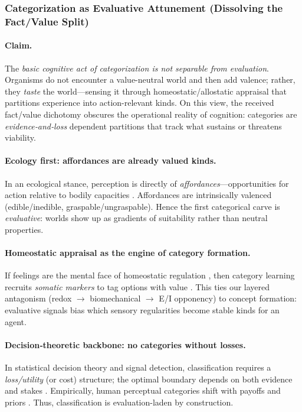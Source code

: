 \subsubsection{Categorization as Evaluative Attunement (Dissolving the Fact/Value Split)}
\label{subsec:categorization_evaluative}

\paragraph{Claim.}
The \emph{basic cognitive act of categorization is not separable from evaluation}. Organisms do not encounter a value-neutral world and then add valence; rather, they \emph{taste} the world—sensing it through homeostatic/allostatic appraisal that partitions experience into action-relevant kinds. On this view, the received fact/value dichotomy obscures the operational reality of cognition: categories are \emph{evidence‐and‐loss} dependent partitions that track what sustains or threatens viability.

\paragraph{Ecology first: affordances are already valued kinds.}
In an ecological stance, perception is directly of \emph{affordances}—opportunities for action relative to bodily capacities \citep{Gibson1979_Ecological}. Affordances are intrinsically valenced (edible/inedible, graspable/ungraspable). Hence the first categorical carve is \emph{evaluative}: worlds show up as gradients of suitability rather than neutral properties.

\paragraph{Homeostatic appraisal as the engine of category formation.}
If feelings are the mental face of homeostatic regulation \citep{Damasio1999_Feeling,Damasio2018_StrangeOrder}, then category learning recruits \emph{somatic markers} to tag options with value \citep{Damasio1994_DescartesError,Bechara1997_SomaticMarkers}. This ties our layered antagonism (redox $\to$ biomechanical $\to$ E/I opponency) to concept formation: evaluative signals bias which sensory regularities become stable kinds for an agent.

\paragraph{Decision‐theoretic backbone: no categories without losses.}
In statistical decision theory and signal detection, classification requires a \emph{loss/utility} (or cost) structure; the optimal boundary depends on both evidence and stakes \citep{Wald1950_StatisticalDecision,GreenSwets1966_SDT}. Empirically, human perceptual categories shift with payoffs and priors \citep{KnillPouget2004_BayesianBrain,GoldShadlen2007_DecisionNeuro}. Thus, classification is evaluation-laden by construction.

